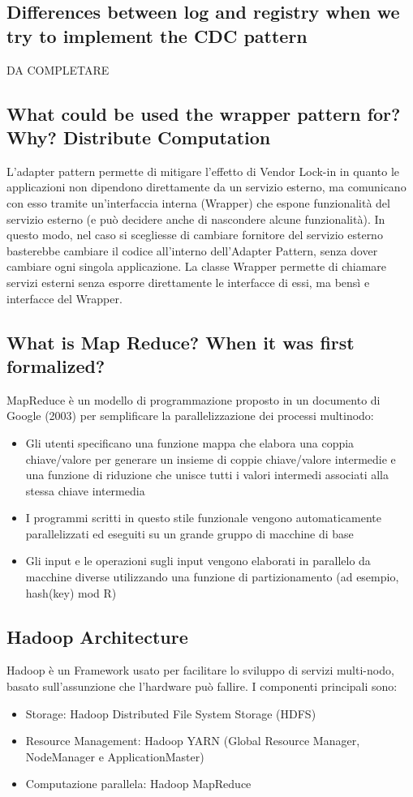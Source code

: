 \documentclass{article}
\begin{document}
\subsection{Differences between log and registry when we try to implement the CDC pattern}
DA COMPLETARE
\subsection{What could be used the wrapper pattern for? Why?
Distribute Computation}
L’adapter pattern permette di mitigare l’effetto di Vendor Lock-in in quanto le applicazioni non dipendono direttamente da un servizio esterno, ma comunicano con esso tramite un'interfaccia interna (Wrapper) che espone funzionalità del servizio esterno (e può decidere anche di nascondere alcune funzionalità). In questo modo, nel caso si scegliesse di cambiare fornitore del servizio esterno basterebbe cambiare il codice all'interno dell'Adapter Pattern, senza dover cambiare ogni singola applicazione.
La classe Wrapper permette di chiamare servizi esterni senza esporre direttamente le interfacce di essi, ma bensì e interfacce del Wrapper.


\subsection{What is Map Reduce? When it was first formalized?}
MapReduce è un modello di programmazione proposto in un documento di Google (2003) per semplificare la parallelizzazione dei processi multinodo:
\begin{itemize}
    \item Gli utenti specificano una funzione mappa che elabora una coppia chiave/valore per generare un insieme di coppie chiave/valore intermedie e una funzione di riduzione che unisce tutti i valori intermedi associati alla stessa chiave intermedia
    \item I programmi scritti in questo stile funzionale vengono automaticamente parallelizzati ed eseguiti su un grande gruppo di macchine di base
    \item Gli input e le operazioni sugli input vengono elaborati in parallelo da macchine diverse utilizzando una funzione di partizionamento (ad esempio, hash(key) mod R)
    
\end{itemize}
\subsection{Hadoop Architecture}
Hadoop è un Framework usato per facilitare lo sviluppo di servizi multi-nodo, basato sull'assunzione che l'hardware può fallire.
I componenti principali sono:
\begin{itemize}
    \item Storage: Hadoop Distributed File System Storage (HDFS)
    \item Resource Management: Hadoop YARN (Global Resource Manager, NodeManager e ApplicationMaster)
    \item Computazione parallela: Hadoop MapReduce
\end{itemize}
\end{document}
